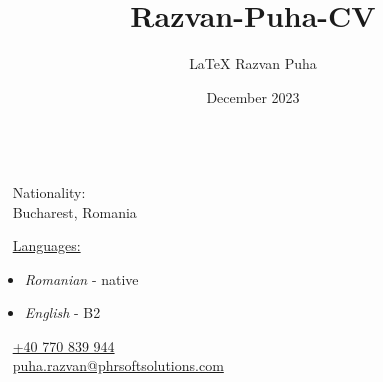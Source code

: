 \documentclass{modernsimplecv}
\title{Razvan-Puha-CV}
\author{\LaTeX{} Razvan Puha}
\date{December 2023}
\begin{document}
    \pagestyle{fancy}
    \fancyhf{} %
    \begin{minipage}[t]{\textwidth}
        \vspace{0pt} %
        \begin{shaded*}
            \begin{multicols}{2}
                \begin{minipage}[t]{0.4\textwidth}
                    \vspace{0pt} %
                    {
                        \par\centering\huge{}
                    } \\[0.3cm]
                    
                    \faGlobe~ Nationality:  \\
                    \faLocationArrow~ Bucharest, Romania \\
            
                    {
                        \small
                        \faComments~ \underline{Languages:} 
                        \begin{itemize}
                            \item \emph{Romanian} - native
                            \item \emph{English} - B2
                        \end{itemize}
                    }
                \end{minipage}
            
                \hfill
            
                \begin{minipage}[t]{0.4\textwidth}
                    \vspace{0pt} %
                    \vspace{1cm}
                    \faPhone~ \href{tel:+40770839944}{+40 770 839 944} \\
                    \faAt~ \href{mailto:puha.razvan@phrsoftsolutions.com}{puha.razvan@phrsoftsolutions.com} \\
                    

\end{minipage}
\end{multicols}
\end{shaded*}
\end{minipage}
\end{document}
